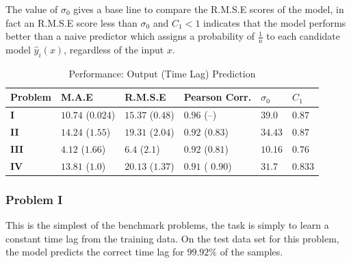\documentclass[envcountsect,runningheads]{llncs}
\theoremstyle{etoile}
\begin{document}
The value of $\sigma_0$ gives a base line to compare the R.M.S.E scores of the model, 
in fact an R.M.S.E score less than $\sigma_0$ and $C_1 < 1$ indicates that the model 
performs better than a naive predictor which assigns a probability of $\frac{1}{n}$ 
to each candidate model $\hat{y}_i(x)$, regardless of the input $x$.

\begin{table}
  \caption{Performance: Output (Time Lag) Prediction}\label{tab:results_syn}
  \centering
  \begin{tabular}{ l l l l l l}
  \hline
  Problem &  M.A.E & R.M.S.E & Pearson Corr. & $\sigma_0$ & $C_1$\\
  \hline
  \textbf{I} & $10.74$ ($0.024$)  & $15.37$ ($0.48$) & $0.96$ (--) & $39.0$ & $0.87$\\
  \textbf{II} & $14.24$ ($1.55$) & $19.31$ ($2.04$) & $0.92$ ($0.83$) & $34.43$ & $0.87$\\
  \textbf{III} & $4.12$ ($1.66$) & $6.4$ ($2.1$) & $0.92$ ($0.81$) & $10.16$ & $0.76$\\
  \textbf{IV} & $13.81$ ($1.0$) & $20.13$ ($1.37$) & $0.91$ ( $0.90$) & $31.7$ & $0.833$\\
  \hline
  \end{tabular}
\end{table}


\subsubsection{Problem I}

This is the simplest of the benchmark problems, the task is simply to learn a constant time lag from 
the training data. On the test data set for this problem, the model predicts the correct time lag for 
$99.92\%$ of the samples.
\end{document}
